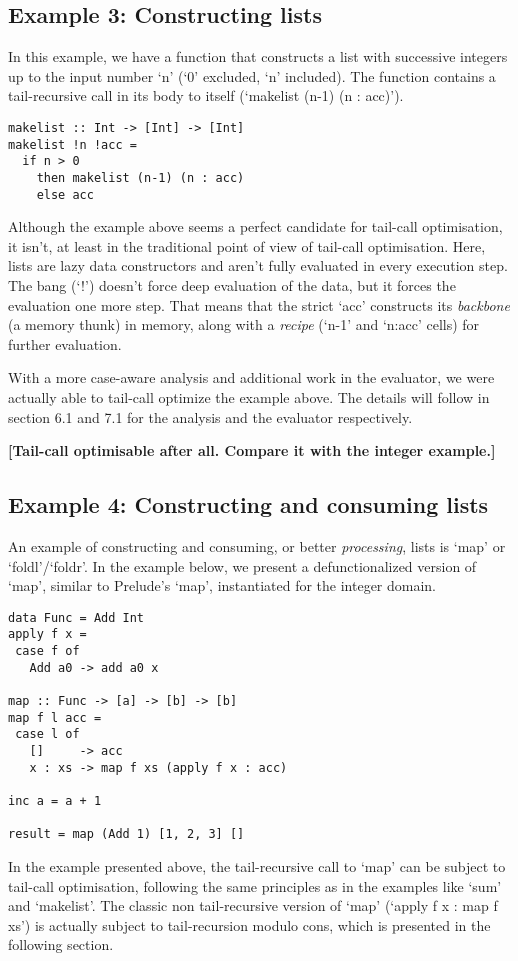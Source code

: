 \documentclass[diploma]{softlab-thesis}
\begin{document}
\subsection {Example 3: Constructing lists}
In this example, we have a function that constructs a list with successive 
integers up to the input number `n' (`0' excluded, `n' included). The function contains 
a tail-recursive call in its body to itself (`makelist (n-1) (n : acc)'). 

\begin{verbatim}
makelist :: Int -> [Int] -> [Int]
makelist !n !acc = 
  if n > 0 
    then makelist (n-1) (n : acc)
    else acc
\end{verbatim}

Although the example above seems a perfect candidate for tail-call optimisation, it isn't, 
at least in the traditional point of view of tail-call optimisation. Here, lists are 
lazy data constructors and aren't fully evaluated in every execution step. The bang (`!') doesn't 
force deep evaluation of the data, but it forces the evaluation one more step. That means that the strict 
`acc' constructs its \textit{backbone} (a memory thunk) in memory, along with a \textit{recipe} 
(`n-1' and `n:acc' cells) for further evaluation. 

With a more case-aware analysis and additional work in the evaluator, 
we were actually able to tail-call optimize the example 
above. The details will follow in section 6.1 and 7.1 for the analysis 
and the evaluator respectively. 

\textbf{[Tail-call optimisable after all. Compare it with the integer example.]}

\subsection {Example 4: Constructing and consuming lists}
An example of constructing and consuming, or better \textit{processing}, lists is `map' or `foldl'/`foldr'.
In the example below, we present a defunctionalized version of `map', similar to Prelude's `map', instantiated for
the integer domain.

\begin{verbatim}
data Func = Add Int
apply f x =
 case f of
   Add a0 -> add a0 x

map :: Func -> [a] -> [b] -> [b]
map f l acc =
 case l of
   []     -> acc
   x : xs -> map f xs (apply f x : acc)

inc a = a + 1

result = map (Add 1) [1, 2, 3] []
\end{verbatim}
In the example presented above, 
the tail-recursive call to `map' can be subject to tail-call optimisation, 
following the same principles as in the examples like `sum' and `makelist'. The classic non tail-recursive 
version of `map' (`apply f x : map f xs') is actually subject to tail-recursion modulo cons, which is presented 
in the following section.
\end{document}
